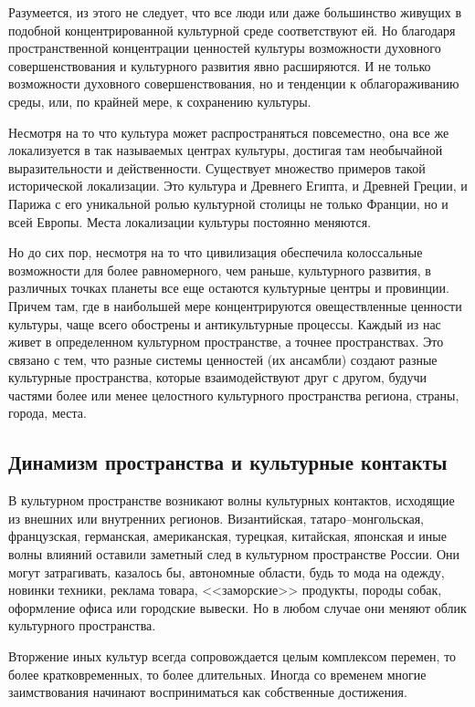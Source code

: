   Разумеется, из этого не следует, что все люди или даже большинство живущих в
  подобной концентрированной культурной среде соответствуют ей. Но благодаря
  пространственной концентрации ценностей культуры возможности духовного
  совершенствования и культурного развития явно расширяются. И не только
  возможности духовного совершенствования, но и тенденции к облагораживанию
  среды, или, по крайней мере, к сохранению культуры.
  
  Несмотря на то что культура может распространяться повсеместно, она все же
  локализуется в так называемых центрах культуры, достигая там необычайной
  выразительности и действенности. Существует множество примеров такой
  исторической локализации. Это культура и Древнего Египта, и Древней Греции, и
  Парижа с его уникальной ролью культурной столицы не только Франции, но и всей
  Европы. Места локализации культуры постоянно меняются.
  
  Но до сих пор, несмотря на то что цивилизация обеспечила колоссальные
  возможности для более равномерного, чем раньше, культурного развития, в
  различных точках планеты все еще остаются культурные центры и провинции.
  Причем там, где в наибольшей мере концентрируются овеществленные ценности
  культуры, чаще всего обострены и антикультурные процессы. Каждый из нас живет
  в определенном культурном пространстве, а точнее пространствах. Это связано с
  тем, что разные системы ценностей (их ансамбли) создают разные культурные
  пространства, которые взаимодействуют друг с другом, будучи частями более или
  менее целостного культурного пространства региона, страны, города, места.

  \subsection{Динамизм пространства и культурные контакты}
  
  В культурном пространстве возникают волны культурных контактов, исходящие из
  внешних или внутренних регионов. Византийская, татаро–монгольская,
  французская, германская, американская, турецкая, китайская, японская и иные
  волны влияний оставили заметный след в культурном пространстве России. Они
  могут затрагивать, казалось бы, автономные области, будь то мода на одежду,
  новинки техники, реклама товара, <<заморские>> продукты, породы собак,
  оформление офиса или городские вывески. Но в любом случае они меняют облик
  культурного пространства.
  
  Вторжение иных культур всегда сопровождается целым комплексом перемен, то
  более кратковременных, то более длительных. Иногда со временем многие
  заимствования начинают восприниматься как собственные достижения.
  
